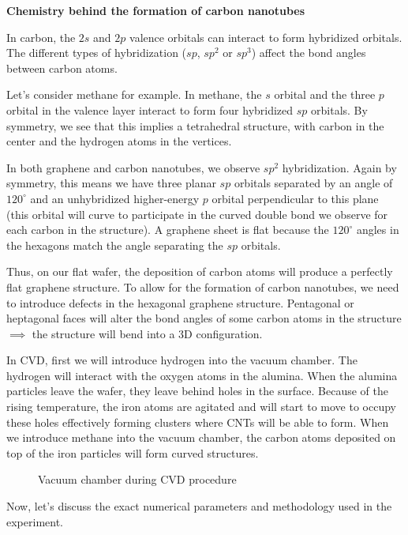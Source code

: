 \documentclass[a4paper,12pt,twoside]{article}
\begin{document}
\begin{tcolorbox}
\textbf{Chemistry behind the formation of carbon nanotubes}

In carbon, the $2s$ and $2p$ valence orbitals can interact to form hybridized orbitals. The different types of hybridization ($sp$, $sp^2$ or $sp^3$) affect the bond angles between carbon atoms.

Let's consider methane for example. In methane, the $s$ orbital and the three $p$ orbital in the valence layer interact to form four hybridized $sp$ orbitals. By symmetry, we see that this implies a tetrahedral structure, with carbon in the center and the hydrogen atoms in the vertices.

In both graphene and carbon nanotubes, we observe $sp^2$ hybridization. Again by symmetry, this means we have three planar $sp$ orbitals separated by an angle of $120^{\circ}$ and an unhybridized higher-energy $p$ orbital perpendicular to this plane (this orbital will curve to participate in the curved double bond we observe for each carbon in the structure). A graphene sheet is flat because the $120^{\circ}$ angles in the hexagons match the angle separating the $sp$ orbitals.

Thus, on our flat wafer, the deposition of carbon atoms will produce a perfectly flat graphene structure. To allow for the formation of carbon nanotubes, we need to introduce defects in the hexagonal graphene structure. Pentagonal or heptagonal faces will alter the bond angles of some carbon atoms in the structure $\implies$ the structure will bend into a 3D configuration.
\end{tcolorbox}

In CVD, first we will introduce hydrogen into the vacuum chamber. The hydrogen will interact with the oxygen atoms in the alumina. When the alumina particles leave the wafer, they leave behind holes in the surface. Because of the rising temperature, the iron atoms are agitated and will start to move to occupy these holes effectively forming clusters where CNTs will be able to form. When we introduce methane into the vacuum chamber, the carbon atoms deposited on top of the iron particles will form curved structures.

\begin{figure}
    \centering
    \caption{Vacuum chamber during CVD procedure}
    \label{fig:CVD}
\end{figure}

Now, let's discuss the exact numerical parameters and methodology used in the experiment.
\end{document}
